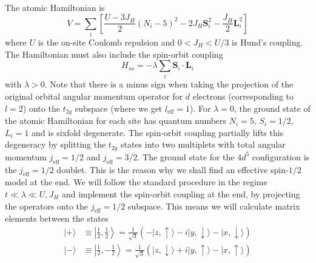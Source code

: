 \documentclass[11pt, a4paper]{article}
\begin{document}
The atomic Hamiltonian is
\begin{equation}
V = \sum_i \left[ \frac{U-3J_H}{2}(N_i-5)^2 - 2J_H \bm{S}_i^2 - \frac{J_H}{2}\bm{L}_i^2 \right] \label{eq:atomic_V}
\end{equation}
where $U$ is the on-site Coulomb repulsion and $0 < J_H < U/3$ is Hund's coupling. The Hamiltonian must also include the spin-orbit coupling
\begin{equation}
H_{so} = -\lambda \sum_i \bm{S}_i \cdot \bm{L}_i
\end{equation}
with $\lambda > 0$. Note that there is a minus sign when taking the projection of the original orbital angular momentum operator for $d$ electrons (corresponding to $l=2$) onto the $t_{2g}$ subspace (where we get $l_{\text{eff}}=1$). For $\lambda=0$, the ground state of the atomic Hamiltonian for each site has quantum numbers $N_i=5$, $S_i=1/2$, $L_i=1$ and is sixfold degenerate. The spin-orbit coupling partially lifts this degeneracy by splitting the $t_{2g}$ states into two multiplets with total angular momentum $j_{\text{eff}}=1/2$ and $j_{\text{eff}}=3/2$. The ground state for the $4d^5$ configuration is the $j_{\text{eff}}=1/2$ doublet. This is the reason why we shall find an effective spin-$1/2$ model at the end. We will follow the standard procedure in the regime $t \ll \lambda \ll U, J_H$ and implement the spin-orbit coupling at the end, by projecting the operators onto the $j_{\text{eff}}=1/2$ subspace. This means we will calculate matrix elements between the states
\begin{align}
|+\rangle &\equiv \left|\frac{1}{2}, \frac{1}{2}\right\rangle = \frac{1}{\sqrt{3}} (-|z, \uparrow\rangle - i|y, \downarrow\rangle - |x, \downarrow\rangle) \\
|-\rangle &\equiv \left|\frac{1}{2}, -\frac{1}{2}\right\rangle = \frac{1}{\sqrt{3}} (|z, \downarrow\rangle + i|y, \uparrow\rangle - |x, \uparrow\rangle)
\end{align}
\end{document}
